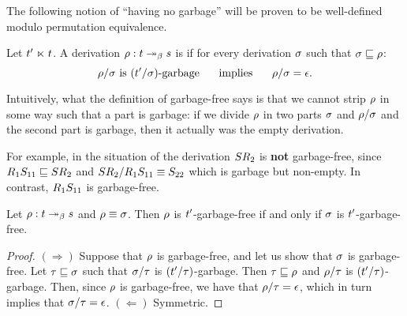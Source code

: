 The following notion of ``having no garbage'' will be proven to be well-defined
modulo permutation equivalence.

\begin{definition}
Let $t' \mathrel{\ltimes} t$.
A derivation $\rho : t \mathrel{\twoheadrightarrow_\beta} s$ is 
if
for every derivation $\sigma$ such that $\sigma \sqsubseteq \rho$:
\[
  \rho/\sigma \text{ is $(t'/\sigma)$-garbage}
  \hspace{.5cm}\text{ implies }\hspace{.5cm}
  \rho/\sigma = \epsilon.
\]
\end{definition}

Intuitively, what the definition of garbage-free says is that we cannot strip
$\rho$ in some way such that a part is garbage: if we
divide $\rho$ in two parts $\sigma$ and $\rho / \sigma$
and the second part is garbage, then it actually was the empty derivation.

For example, in the situation of 
the derivation $SR_2$ is {\bf not} garbage-free,
since $R_1S_{11} \sqsubseteq SR_2$
and $SR_2/R_1S_{11} \equiv S_{22}$
which is garbage but non-empty.
In contrast, $R_1S_{11}$ is garbage-free.


\begin{lemma}
Let $\rho : t \mathrel{\twoheadrightarrow_\beta} s$ and $\rho \equiv \sigma$.
Then $\rho$ is $t'$-garbage-free
if and only if $\sigma$ is $t'$-garbage-free.
\end{lemma}
\begin{proof}
$(\Rightarrow)$
Suppose that $\rho$ is garbage-free, and let us show that $\sigma$ is garbage-free.
Let $\tau \sqsubseteq \sigma$ such that $\sigma/\tau$ is $(t'/\tau)$-garbage.
Then $\tau \sqsubseteq \rho$ and $\rho/\tau$ is $(t'/\tau)$-garbage. 
Then, since $\rho$ is garbage-free,
we have that $\rho/\tau = \epsilon$,
which in turn implies that $\sigma/\tau = \epsilon$.
$(\Leftarrow)$ Symmetric.
\end{proof}

